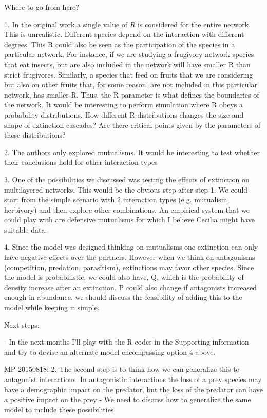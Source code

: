 \documentclass[12pt]{article}
\begin{document}
Where to go from here?

1. In the original work a single value of $R$ is considered for the entire network. This is unrealistic. Different species depend on the interaction with different degrees. This R could also be seen as the participation of the species in a particular network. For instance, if we are studying a frugivory network species that eat insects, but are also included in the network will have smaller R than strict frugivores. Similarly, a species that feed on fruits that we are considering but also on other fruits that, for some reason, are not included in this particular network, has smaller R.  Thus, the R parameter is what defines the boundaries of the network. It would be interesting to perform simulation where R obeys a probability distributions. How different R distributions changes the size and shape of extinction cascades? Are there critical points given by the parameters of these distributions?

2. The authors only explored mutualisms. It would be interesting to test whether their conclusions hold for other interaction types

3. One of the possibilities we discussed was testing the effects of extinction on multilayered networks. This would be the obvious step after step 1. We could start from the simple scenario with 2 interaction types (e.g. mutualism, herbivory) and then explore other combinations. An empirical system that we could play with are defensive mutualisms for which I believe Cecilia might have suitable data.

4. Since the model was designed thinking on mutualisms one extinction can only have negative effects over the partners. However when we think on antagonisms (competition, predation, parasitism), extinctions may favor other species. Since the model is probabilistic, we could also have, Q, which is the probability of density increase after an extinction. P could also change if antagonists increased enough in abundance. we should discuss the feasibility of adding this to the model while keeping it simple.


Next steps:

- In the next months I'll play with the R codes in the Supporting information and try to devise an alternate model encompassing option 4 above.



MP 20150818:
2. The second step is to think how we can generalize this to antagonist interactions. In antagonistic interactions the loss of a prey species may have a demographic impact on the predator, but the loss of the predator can have a positive impact on the prey - We need to discuss how to generalize the same model to include these possibilities
\end{document}
